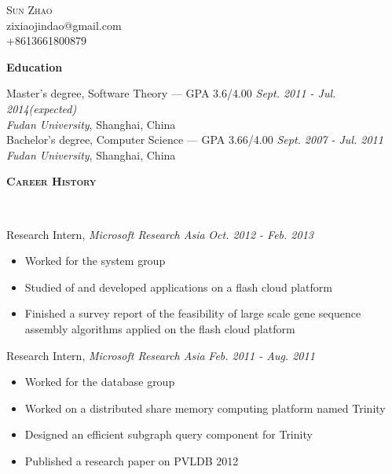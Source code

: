 \documentclass[9pt]{article}
\newenvironment{changemargin}[2]{%
  \begin{list}{}{%
    \setlength{\topsep}{0pt}%
    \setlength{\leftmargin}{#1}%
    \setlength{\rightmargin}{#2}%
    \setlength{\listparindent}{\parindent}%
    \setlength{\itemindent}{\parindent}%
    \setlength{\parsep}{\parskip}%
  }%
  \item[]}{\end{list}
}
\newcommand{\lineover}{
	\begin{changemargin}{-0.05in}{-0.05in}
		\vspace*{-8pt}
		\hrulefill \\
		\vspace*{-2pt}
	\end{changemargin}
}
\newcommand{\header}[1]{
	\begin{changemargin}{-0.5in}{-0.5in}
		\scshape{#1}\\
  	\lineover
	\end{changemargin}
}
\newcommand{\contact}[4]{
	\begin{changemargin}{-0.5in}{-0.5in}
		\begin{center}
			{\Large \scshape {#1}}\\ \smallskip
			{#2}\\ \smallskip
			{#3}\\ \smallskip
			{#4}\smallskip
		\end{center}
	\end{changemargin}
}
\newenvironment{body} {
	\vspace*{-16pt}
	\begin{changemargin}{-0.25in}{-0.5in}
  }	
	{\end{changemargin}
}
\begin{document}
\thispagestyle{empty}
\contact{Sun Zhao}{zixiaojindao@gmail.com}{+8613661800879}


%
%


\header{\textbf{Education}}

\begin{body}
	\vspace{14pt}
	Master's degree, Software Theory --- GPA 3.6/4.00 \hfill \emph{Sept. 2011 - Jul. 2014(expected)} \\
	\emph{Fudan University}, Shanghai, China \\
  \medskip
	Bachelor's degree, Computer Science --- GPA 3.66/4.00 \hfill \emph{Sept. 2007 - Jul. 2011} \\
	\emph{Fudan University}, Shanghai, China\\
\end{body}

\smallskip


\header{\textbf{Career History}}

\begin{body}
	\vspace{14pt}
    Research Intern, \emph{Microsoft Research Asia} \hfill \emph{Oct. 2012 - Feb. 2013}\\
    \vspace*{-4pt}
    \begin{itemize} \itemsep -0pt
    \item Worked for the system group
    \item Studied of and developed applications on a flash cloud platform
    \item Finished a survey report of the feasibility of large scale gene sequence assembly algorithms applied on the flash cloud platform
    \end{itemize}

    Research Intern, \emph{Microsoft Research Asia} \hfill \emph{Feb. 2011 - Aug. 2011}\\
    \vspace*{-4pt}
    \begin{itemize} \itemsep -0pt
        \item Worked for the database group
        \item Worked on a distributed share memory computing platform named Trinity
        \item Designed an efficient subgraph query component for Trinity
        \item Published a research paper on PVLDB 2012
    \end{itemize}
\end{body}
\end{document}
